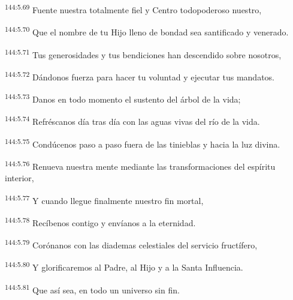 \begin{center}
\par 
\textsuperscript{144:5.69} Fuente nuestra totalmente fiel y Centro todopoderoso nuestro,

\par 
\textsuperscript{144:5.70} Que el nombre de tu Hijo lleno de bondad sea santificado y venerado.

\par 
\textsuperscript{144:5.71} Tus generosidades y tus bendiciones han descendido sobre nosotros,

\par 
\textsuperscript{144:5.72} Dándonos fuerza para hacer tu voluntad y ejecutar tus mandatos.

\par 
\textsuperscript{144:5.73} Danos en todo momento el sustento del árbol de la vida;

\par 
\textsuperscript{144:5.74} Refréscanos día tras día con las aguas vivas del río de la vida.

\par 
\textsuperscript{144:5.75} Condúcenos paso a paso fuera de las tinieblas y hacia la luz divina.

\par 
\textsuperscript{144:5.76} Renueva nuestra mente mediante las transformaciones del espíritu interior,

\par 
\textsuperscript{144:5.77} Y cuando llegue finalmente nuestro fin mortal,

\par 
\textsuperscript{144:5.78} Recíbenos contigo y envíanos a la eternidad.

\par 
\textsuperscript{144:5.79} Corónanos con las diademas celestiales del servicio fructífero,

\par 
\textsuperscript{144:5.80} Y glorificaremos al Padre, al Hijo y a la Santa Influencia.

\par 
\textsuperscript{144:5.81} Que así sea, en todo un universo sin fin.
\end{center}

